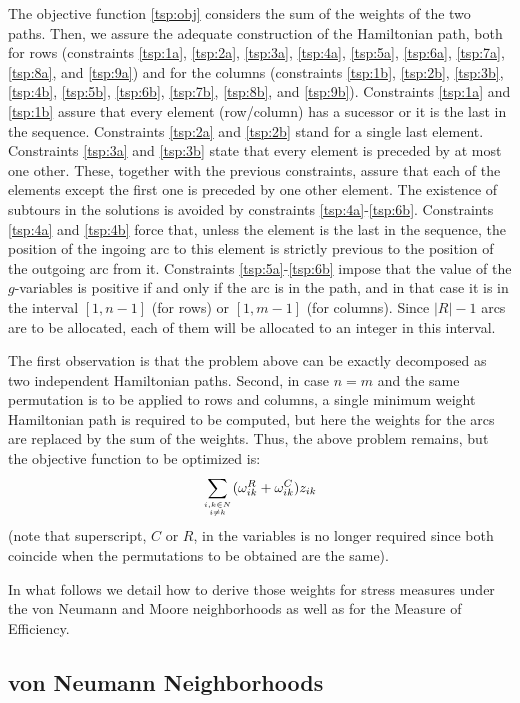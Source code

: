 \documentclass[a4paper,11pt, reqno]{amsart}
\begin{document}
The objective function \eqref{tsp:obj} considers the sum of the weights of the two paths.  Then, we assure the adequate construction of the Hamiltonian path, both for rows (constraints \eqref{tsp:1a}, \eqref{tsp:2a}, \eqref{tsp:3a}, \eqref{tsp:4a}, \eqref{tsp:5a}, \eqref{tsp:6a}, \eqref{tsp:7a}, \eqref{tsp:8a}, and \eqref{tsp:9a}) and for the columns (constraints \eqref{tsp:1b}, \eqref{tsp:2b}, \eqref{tsp:3b}, \eqref{tsp:4b}, \eqref{tsp:5b}, \eqref{tsp:6b}, \eqref{tsp:7b}, \eqref{tsp:8b}, and \eqref{tsp:9b}). 
Constraints \eqref{tsp:1a}  and \eqref{tsp:1b} assure that every element (row/column) has a sucessor or it is the last in the sequence. 
Constraints \eqref{tsp:2a} and \eqref{tsp:2b} stand for a single last element. 
Constraints \eqref{tsp:3a} and \eqref{tsp:3b} state that every element is preceded by at most one other. These, together with the previous constraints, assure that each of the elements except the first one is preceded by one other element. 
The existence of subtours in the solutions is avoided by constraints \eqref{tsp:4a}-\eqref{tsp:6b}. Constraints \eqref{tsp:4a} and \eqref{tsp:4b} force that, unless the element is the last in the sequence, the position of the ingoing arc to this element is strictly previous to the position of the outgoing arc from it. Constraints \eqref{tsp:5a}-\eqref{tsp:6b} impose that the value of the $g$-variables is positive if and only if the arc is in the path, and in that case it is in the interval $[1,n-1]$ (for rows) or $[1,m-1]$ (for columns). Since $|R|-1$ arcs are to be allocated, each of them will be allocated to an integer in this interval.

The first observation is that the problem above can be exactly decomposed as two independent Hamiltonian paths. Second, in case $n=m$ and the same permutation is to be applied to rows and columns, a single minimum weight Hamiltonian path is required to be computed, but here the weights for the arcs  are replaced by the sum of the weights. Thus, the above problem remains, but the objective function to be optimized is:
$$
\sum_{i,k \in N\atop i\neq k} (\omega^R_{ik} + \omega^C_{ik}) z_{ik}
$$
(note that superscript, $C$ or $R$, in the variables is no longer required since both coincide when the permutations to be obtained are the same).


In what follows we detail how to derive those weights for stress measures under the von Neumann and Moore neighborhoods as well as for the Measure of Efficiency.

\subsection{von Neumann Neighborhoods}
\end{document}
